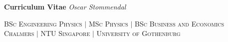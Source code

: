 \documentclass[a4paper,12pt]{article}
\begin{document}
\pagestyle{fancy}
\fancyhf{} %
\renewcommand{\headrulewidth}{0pt}


{\Huge \textbf{Curriculum Vitae} \hfill \textit{Oscar Stommendal}} \\[-0.7cm]

\hrulefill%

\textsc{BSc Engineering Physics $\vert$ MSc Physics $\vert$ BSc Business and Economics \\[0.2cm] Chalmers $\vert$ NTU Singapore $\vert$ University of Gothenburg}\\[-0.9cm]

\hrulefill%
\end{document}

